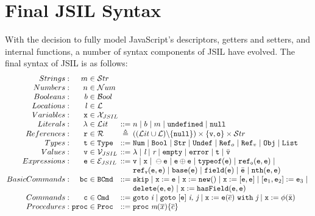 \documentclass[a4paper,11pt,twoside]{report}
\begin{document}
\section{Final JSIL Syntax}\label{sec:finjsilsyntax}
With the decision to fully model JavaScript's descriptors, getters and setters, and internal functions, a number of syntax components of JSIL have evolved. The final syntax of JSIL is as follows:
$$
\arraycolsep=1.5pt
\begin{array}{rrclcl}
Strings : &  m & \in & \mathcal{S}tr \\
Numbers : &  n & \in & \mathcal{N}um \\
Booleans : &  b & \in & \mathcal{B}ool \\
Locations : &  l & \in & \mathcal{L} \\
Variables : &  \mathtt{x} & \in & \mathcal{X}_{JSIL} \\
Literals : &  \mathtt{\lambda} & \in & \mathcal{L}it & ::= & n \myor b \myor m \myor \mathtt{undefined} \myor \mathtt{null} \\
References : &  \mathtt{r} & \in & \mathcal{R} & \triangleq & ((\mathcal{L}it \cup \mathcal{L}) \backslash \{ \mathtt{null} \}) \times \{ \mathtt{v, o} \} \times \mathcal{S}tr\\
Types: & \mathtt{t} & \in & \mathtt{Type} & ::= & \mathtt{Num} \myor \mathtt{Bool} \myor \mathtt{Str} \myor \mathtt{Undef} \myor \mathtt{Ref}_o \myor \mathtt{Ref}_v \myor \mathtt{Obj} \myor \mathtt{List} \\
Values: & \mathtt{v} & \in & \mathcal{V}_{JSIL} & ::= &\lambda \myor \textit{l} \myor \textit{r} \myor \mathtt{empty} \myor \mathtt{error} \myor \mathtt{t} \myor \bar{\mathtt{v}} \\
Expressions: & \mathtt{e} & \in & \mathcal{E}_{JSIL} & ::= &\mathtt{v} \myor \mathtt{x} \myor \ominus \mathtt{e} \myor \mathtt{e} \oplus \mathtt{e} \myor \mathtt{typeof}(\mathtt{e}) \myor \mathtt{ref_o}(\mathtt{e,e}) \myor \\
& & & & & \mathtt{ref_v}(\mathtt{e,e}) \myor \mathtt{base}(\mathtt{e}) \myor \mathtt{field}(\mathtt{e}) \myor \bar{\mathtt{e}} \myor \mathtt{nth (e, e)}
\\
Basic Commands: & \mathtt{bc} & \in & \mathtt{BCmd} & ::= & \mathtt{skip} \myor \mathtt{x} := \mathtt{e} \myor \mathtt{x} := \mathtt{new}() \myor \mathtt{x} := [\mathtt{e,e}] \myor [\mathtt{e}_1,\mathtt{e}_2] := \mathtt{e}_3 \myor  \\
& & & & & \mathtt{delete}(\mathtt{e,e}) \myor \mathtt{x} := \mathtt{hasField}(\mathtt{e,e}) \\
Commands: & \mathtt{c} & \in & \mathtt{Cmd} & ::= & \mathtt{goto} \hspace{3pt} \textit{i} \myor \mathtt{goto} \hspace{3pt} [\mathtt{e}] \hspace{3pt} \textit{i, j} \myor \mathtt{x} := \mathtt{e}(\overline{e})\ \mathtt{with}\ \textit{j} \myor \mathtt{x} := \phi(\bar{\mathtt{x}})
\\
Procedures: & \mathtt{proc} & \in & \mathtt{Proc} & ::= & \mathtt{proc} \hspace{3pt} \textit{m}(\overline{x})\{\overline{c}\}
\end{array}
$$
\end{document}
